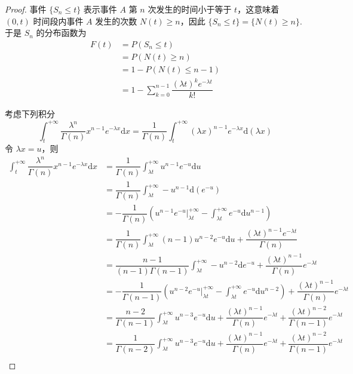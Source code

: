\begin{proof}
    事件 $\{ S_n \leqslant t \}$ 表示事件 $A$ 第 $n$ 次发生的时间小于等于 $t$，这意味着 $(0,t)$ 时间段内事件 $A$ 发生的次数 $N(t) \geqslant n$，因此 $\{ S_n \leqslant t \} = \{ N(t) \geqslant n \}$.于是 $S_n$ 的分布函数为
    $$
    \begin{aligned}
        F(t) &= P(S_n \leqslant t) \\
        &= P(N(t) \geqslant n) \\
        &= 1 - P(N(t) \leqslant n-1) \\
        &= 1 - \sum_{k=0}^{n-1} \dfrac{(\lambda t)^k e^{-\lambda t}}{k!}
    \end{aligned}
    $$

    考虑下列积分
    $$
    \int_{t}^{+\infty} \dfrac{\lambda^n}{\Gamma(n)} x^{n-1} e^{-\lambda x} \text{d}x = \dfrac{1}{\Gamma(n)} \int_{t}^{+\infty} (\lambda x)^{n-1} e^{-\lambda x} \text{d}(\lambda x)
    $$
    令 $\lambda x = u$，则
    $$
    \begin{aligned}
        \int_{t}^{+\infty} \dfrac{\lambda^n}{\Gamma(n)} x^{n-1} e^{-\lambda x} \text{d}x &= \dfrac{1}{\Gamma(n)} \int_{\lambda t}^{+\infty} u^{n-1} e^{-u} \text{d}u \\
        &= \dfrac{1}{\Gamma(n)} \int_{\lambda t}^{+\infty} -u^{n-1} \text{d}(e^{-u}) \\
        &= -\dfrac{1}{\Gamma(n)} \left( u^{n-1} e^{-u} \Big|_{\lambda t}^{+\infty} - \int_{\lambda t}^{+\infty} e^{-u} \text{d} u^{n-1} \right) \\
        &= \dfrac{1}{\Gamma(n)} \int_{\lambda t}^{+\infty} (n-1) u^{n-2} e^{-u} \text{d}u + \dfrac{(\lambda t)^{n-1} e^{-\lambda t}}{\Gamma(n)} \\
        &= \dfrac{n-1}{(n-1) \Gamma(n-1)} \int_{\lambda t}^{+\infty} -u^{n-2} \text{d} e^{-u} + \dfrac{(\lambda t)^{n-1}}{\Gamma(n)} e^{-\lambda t} \\
        &= -\dfrac{1}{\Gamma(n-1)} \left( u^{n-2} e^{-u} \Big|_{\lambda t}^{+\infty} - \int_{\lambda t}^{+\infty} e^{-u} \text{d} u^{n-2} \right) + \dfrac{(\lambda t)^{n-1}}{\Gamma(n)} e^{-\lambda t} \\
        &= \dfrac{n-2}{\Gamma(n-1)} \int_{\lambda t}^{+\infty} u^{n-3} e^{-u} \text{d}u + \dfrac{(\lambda t)^{n-1}}{\Gamma(n)} e^{-\lambda t} + \dfrac{(\lambda t)^{n-2}}{\Gamma(n-1)} e^{-\lambda t} \\
        &= \dfrac{1}{\Gamma(n-2)} \int_{\lambda t}^{+\infty} u^{n-3} e^{-u} \text{d}u + \dfrac{(\lambda t)^{n-1}}{\Gamma(n)} e^{-\lambda t} + \dfrac{(\lambda t)^{n-2}}{\Gamma(n-1)} e^{-\lambda t} \\

\end{aligned}$$
\end{proof}
